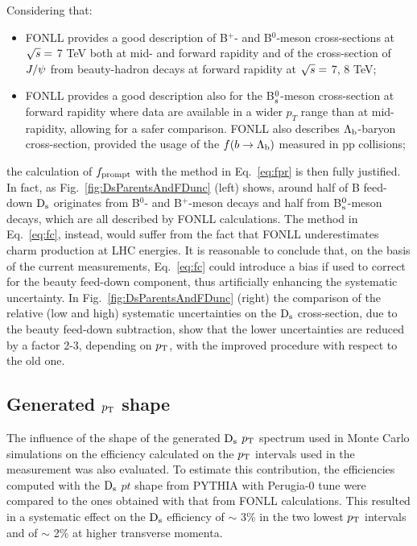 Considering that:
\begin{itemize}
\item FONLL provides a good description of B$^{+}$- and B$^{0}$-meson 
cross-sections at $\sqrt{s} =$ 7 TeV both at mid- and forward rapidity and of 
the cross-section of $J/{\rm \psi}$ from beauty-hadron decays at forward rapidity at  $\sqrt{s} =$ 7, 8 TeV;
\item FONLL provides a good description also for the 
B$^0_{\rm s}$-meson cross-section at forward rapidity where data are available in a wider $p_{T}$ range 
than at mid-rapidity, allowing for a safer comparison. FONLL also describes 
$\Lambda_{\rm b}$-baryon cross-section, provided 
the usage of the $f(b\rightarrow \Lambda_{\rm b})$ measured in pp collisions;
\end{itemize}
the calculation of $f_{\rm prompt}$ with the method in Eq.~\ref{eq:fpr} is then fully justified.
In fact, as Fig.~\ref{fig:DsParentsAndFDunc} (left) shows, around half of B feed-down 
${\rm D_s}$ originates from B$^0$- and B$^+$-meson decays 
and half from B$^0_{\rm s}$-meson decays, which are all described
by FONLL calculations.
The method in Eq.~\ref{eq:fc}, instead, would suffer from the 
fact that FONLL underestimates charm production at LHC energies. 
It is reasonable to conclude that, on the basis of the current 
measurements, Eq.~\ref{eq:fc} could introduce a bias if 
used to correct for the beauty feed-down component, thus artificially enhancing 
the systematic uncertainty. In Fig.~\ref{fig:DsParentsAndFDunc} (right) the comparison of the 
relative (low and high) systematic uncertainties on the ${\rm D_s}$ cross-section, 
due to the beauty feed-down subtraction, show that the lower uncertainties are reduced by a factor 2-3, 
depending on $p_{\rm T}$, with the improved procedure with respect to the old one.

\subsection{Generated $p_{\rm T}$ shape}

The influence of the shape of the generated ${\rm D_s}$ $p_{\rm T}$ spectrum used in 
Monte Carlo simulations on the efficiency calculated on the $p_{\rm T}$ intervals used
in the measurement was also evaluated. 
To estimate this contribution, the efficiencies computed with the ${\rm D_s}$ $pt$ shape from PYTHIA with Perugia-0 tune
were compared to the ones obtained with that from FONLL calculations. 
This resulted in a systematic effect on the ${\rm D_s}$ efficiency of $\sim$ 3\% 
in the two lowest $p_{\rm T}$ intervals and of $\sim$ 2\% at higher transverse momenta.\\

